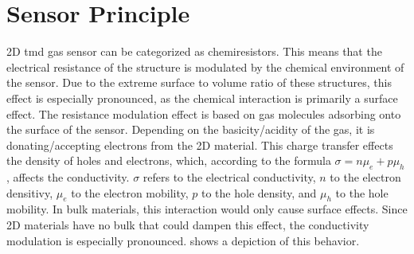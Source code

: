 \section{Sensor Principle}
\label{sec:functionality}
2D \gls{tmd} gas sensor can be categorized as chemiresistors. This means that the electrical resistance of the structure is modulated by the chemical environment of the sensor. Due to the extreme surface to volume ratio of these structures, this effect is especially pronounced, as the chemical interaction is primarily a surface effect. The resistance modulation effect is based on gas molecules adsorbing onto the surface of the sensor. Depending on the basicity/acidity of the gas, it is donating/accepting electrons from the 2D material. This charge transfer effects the density of holes and electrons, which, according to the formula $\sigma = n\mu_e + p\mu_h$, affects the conductivity. $\sigma$ refers to the electrical conductivity, $n$ to the electron densitivy, $\mu_e$ to the electron mobility, $p$ to the hole density, and $\mu_h$ to the hole mobility. In bulk materials, this interaction would only cause surface effects. Since 2D materials have no bulk that could dampen this effect, the conductivity modulation is especially pronounced.  shows a depiction of this behavior. 

